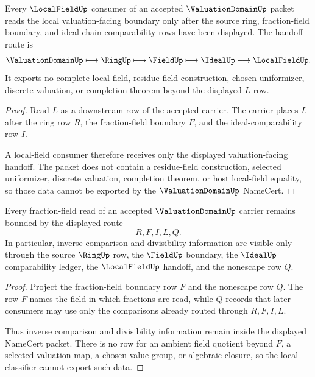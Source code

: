 \begin{theorem}
\label{thm:valuation-domain-localfield-handoff}
Every $\LocalFieldUp$ consumer of an accepted $\ValuationDomainUp$ packet reads the local valuation-facing boundary only after the source ring, fraction-field boundary, and ideal-chain comparability rows have been displayed. The handoff route is
$$
\ValuationDomainUp \longmapsto \RingUp \longmapsto \FieldUp \longmapsto \IdealUp \longmapsto \LocalFieldUp .
$$
It exports no complete local field, residue-field construction, chosen uniformizer, discrete valuation, or completion theorem beyond the displayed $L$ row.
\end{theorem}
\begin{proof}
Read $L$ as a downstream row of the accepted carrier. The carrier places $L$ after the ring row $R$, the fraction-field boundary $F$, and the ideal-comparability row $I$.

A local-field consumer therefore receives only the displayed valuation-facing handoff. The packet does not contain a residue-field construction, selected uniformizer, discrete valuation, completion theorem, or host local-field equality, so those data cannot be exported by the $\ValuationDomainUp$ NameCert.
\end{proof}

\begin{theorem}
\label{thm:valuation-domain-fraction-field-boundary}
Every fraction-field read of an accepted $\ValuationDomainUp$ carrier remains bounded by the displayed route
$$
R,F,I,L,Q .
$$
In particular, inverse comparison and divisibility information are visible only through the source $\RingUp$ row, the $\FieldUp$ boundary, the $\IdealUp$ comparability ledger, the $\LocalFieldUp$ handoff, and the nonescape row $Q$.
\end{theorem}
\begin{proof}
Project the fraction-field boundary row $F$ and the nonescape row $Q$. The row $F$ names the field in which fractions are read, while $Q$ records that later consumers may use only the comparisons already routed through $R,F,I,L$.

Thus inverse comparison and divisibility information remain inside the displayed NameCert packet. There is no row for an ambient field quotient beyond $F$, a selected valuation map, a chosen value group, or algebraic closure, so the local classifier cannot export such data.
\end{proof}

